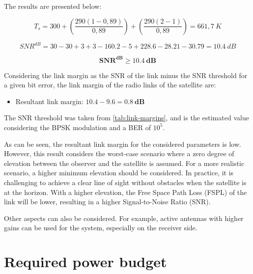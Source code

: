 The results are presented below:

\begin{equation}
    T_{s} = 300 + \left( \frac{290 (1 - 0,89)}{0,89} \right) + \left( \frac{290 (2 - 1)}{0,89} \right) = 661,7\ K
\end{equation}

\begin{equation}
    SNR^{dB} = 30 - 30 + 3 + 3 - 160.2 - 5 + 228.6 - 28.21 - 30.79 = 10.4\ dB
\end{equation}

\begin{equation}
\mathbf{SNR^{dB} \geq 10.4\ dB}
\end{equation}

Considering the link margin as the SNR of the link minus the SNR threshold for a given bit error, the link margin of the radio links of the satellite are:

\begin{itemize}
    \item Resultant link margin: $10.4 - 9.6 = \mathbf{0.8\ dB}$
\end{itemize}

The SNR threshold was taken from \autoref{tab:link-margins}, and is the estimated value considering the BPSK modulation and a BER of $10^{5}$.

As can be seen, the resultant link margin for the considered parameters is low. However, this result considers the worst-case scenario where a zero degree of elevation between the observer and the satellite is assumed. For a more realistic scenario, a higher minimum elevation should be considered. In practice, it is challenging to achieve a clear line of sight without obstacles when the satellite is at the horizon. With a higher elevation, the Free Space Path Loss (FSPL) of the link will be lower, resulting in a higher Signal-to-Noise Ratio (SNR).

Other aspects can also be considered. For example, active antennas with higher gains can be used for the system, especially on the receiver side.

\section{Required power budget}



